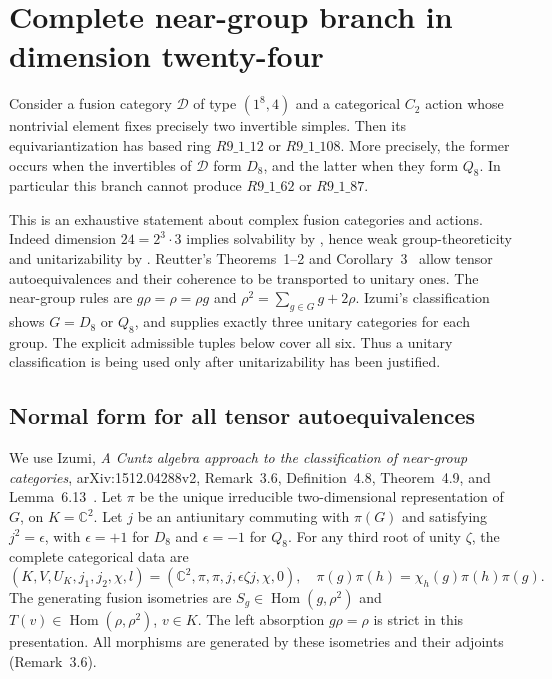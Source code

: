 \section{Complete near-group branch in dimension twenty-four}
\label{sec:ng24-actions}
Consider a fusion category $\mathcal D$ of type $(1^8,4)$ and a categorical
$C_2$ action whose nontrivial element fixes precisely two invertible simples.
Then its equivariantization has based ring $R9\_1\_12$ or $R9\_1\_108$.
More precisely, the former occurs when the invertibles of $\mathcal D$ form
$D_8$, and the latter when they form $Q_8$. In particular this branch cannot
produce $R9\_1\_62$ or $R9\_1\_87$.

This is an exhaustive statement about complex fusion categories and actions.
Indeed dimension $24=2^3\cdot3$ implies solvability by
\cite[Theorem~1.6]{ENOSolvable}, hence weak group-theoreticity and
unitarizability by \cite[Theorem~5.20]{GHR}.
Reutter's Theorems~1--2 and Corollary~3~\cite{Reutter} allow tensor
autoequivalences and their coherence to be transported to unitary ones.
The near-group rules are
$g\rho=\rho=\rho g$ and $\rho^2=\sum_{g\in G}g+2\rho$.
Izumi's classification \cite[Theorems~1.1 and~6.1]{Izumi} shows
$G=D_8$ or $Q_8$, and supplies exactly three
unitary categories for each group. The explicit admissible tuples below
cover all six. Thus a unitary classification is being used only after
unitarizability has been justified.

\subsection{Normal form for all tensor autoequivalences}
We use Izumi, \emph{A Cuntz algebra approach to the classification of
near-group categories}, arXiv:1512.04288v2, Remark~3.6, Definition~4.8,
Theorem~4.9, and Lemma~6.13~\cite{Izumi}. Let $\pi$ be the unique irreducible
two-dimensional representation of $G$, on $K=\mathbb C^2$. Let $j$ be an
antiunitary commuting with $\pi(G)$ and satisfying $j^2=\epsilon$, with
$\epsilon=+1$ for $D_8$ and $\epsilon=-1$ for $Q_8$. For any third root
of unity $\zeta$, the complete categorical data are
\[
(K,V,U_K,j_1,j_2,\chi,l)
=(\mathbb C^2,\pi,\pi,j,\epsilon\zeta j,\chi,0),
\quad
\pi(g)\pi(h)=\chi_h(g)\pi(h)\pi(g).
\]
The generating fusion isometries are
$S_g\in\operatorname{Hom}(g,\rho^2)$ and
$T(v)\in\operatorname{Hom}(\rho,\rho^2)$, $v\in K$.
The left absorption $g\rho=\rho$ is strict in this presentation.
All morphisms are generated by these isometries and their adjoints
(Remark~3.6).

